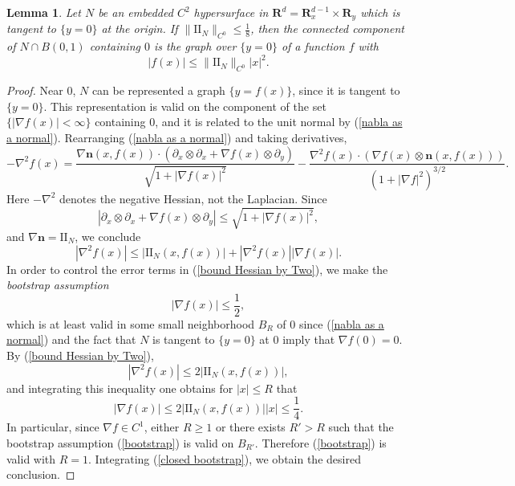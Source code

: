 \documentclass[reqno,11pt]{amsart}
\newcommand{\RR}{\mathbf{R}}
\newcommand{\Two}{\mathrm{I\!I}}
\newcommand{\normal}{\mathbf n}
\newcommand{\dfn}[1]{\emph{#1}\index{#1}}
\newtheorem{lemma}[theorem]{Lemma}
\theoremstyle{definition}
\numberwithin{equation}{section}
\begin{document}
\begin{lemma}\label{existence of tubes}
	Let $N$ be an embedded $C^2$ hypersurface in $\RR^d = \RR^{d - 1}_x \times \RR_y$ which is tangent to $\{y = 0\}$ at the origin.
	If $\|\Two_N\|_{C^0} \leq \frac{1}{8}$, then the connected component of $N \cap B(0, 1)$ containing $0$ is the graph over $\{y = 0\}$ of a function $f$ with
	$$|f(x)| \leq \|\Two_N\|_{C^0} |x|^2.$$
\end{lemma}
\begin{proof}
	Near $0$, $N$ can be represented a graph $\{y = f(x)\}$, since it is tangent to $\{y = 0\}$.
	This representation is valid on the component of the set $\{|\nabla f(x)| < \infty\}$ containing $0$, and it is related to the unit normal by (\ref{nabla as a normal}).
	Rearranging (\ref{nabla as a normal}) and taking derivatives,
	$$-\nabla^2 f(x) = \frac{\nabla \normal(x, f(x)) \cdot (\partial_x \otimes \partial_x + \nabla f(x) \otimes \partial_y)}{\sqrt{1 + |\nabla f(x)|^2}} - \frac{\nabla^2 f(x) \cdot (\nabla f(x) \otimes \normal(x, f(x)))}{(1 + |\nabla f|^2)^{3/2}}.$$
	Here $-\nabla^2$ denotes the negative Hessian, not the Laplacian.
	Since
	$$|\partial_x \otimes \partial_x + \nabla f(x) \otimes \partial_y| \leq \sqrt{1 + |\nabla f(x)|^2},$$
	and $\nabla \normal = \Two_N$, we conclude
\begin{equation}\label{bound Hessian by Two}
	|\nabla^2 f(x)| \leq |\Two_N(x, f(x))| + |\nabla^2 f(x)| |\nabla f(x)|.
\end{equation}
	In order to control the error terms in (\ref{bound Hessian by Two}), we make the \dfn{bootstrap assumption}
\begin{equation}\label{bootstrap}
	|\nabla f(x)| \leq \frac{1}{2},
\end{equation}
	which is at least valid in some small neighborhood $B_R$ of $0$ since (\ref{nabla as a normal}) and the fact that $N$ is tangent to $\{y = 0\}$ at $0$ imply that $\nabla f(0) = 0$.
	By (\ref{bound Hessian by Two}),
$$|\nabla^2 f(x)| \leq 2|\Two_N(x, f(x))|,$$
	and integrating this inequality one obtains for $|x| \leq R$ that
\begin{equation}\label{closed bootstrap}
	|\nabla f(x)| \leq 2|\Two_N(x, f(x))| |x| \leq \frac{1}{4}.
\end{equation}
	In particular, since $\nabla f \in C^1$, either $R \geq 1$ or there exists $R' > R$ such that the bootstrap assumption (\ref{bootstrap}) is valid on $B_{R'}$.
	Therefore (\ref{bootstrap}) is valid with $R = 1$.
	Integrating (\ref{closed bootstrap}), we obtain the desired conclusion.
\end{proof}
\end{document}
